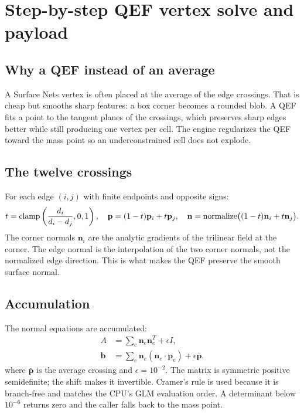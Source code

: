 \section{Step-by-step QEF vertex solve and payload}
\label{sec:qef}

\subsection{Why a QEF instead of an average}

A Surface Nets vertex is often placed at the average of the edge
crossings.  That is cheap but smooths sharp features: a box corner becomes
a rounded blob.  A QEF fits a point to the tangent planes of the crossings,
which preserves sharp edges better while still producing one vertex per
cell.  The engine regularizes the QEF toward the mass point so an
underconstrained cell does not explode.

\subsection{The twelve crossings}

For each edge $(i,j)$ with finite endpoints and opposite signs:
\begin{equation}
  t = \operatorname{clamp}\left(\frac{d_i}{d_i-d_j},0,1\right),
  \quad
  \mathbf{p} = (1-t)\mathbf{p}_i + t\mathbf{p}_j,
  \quad
  \mathbf{n} = \operatorname{normalize}\bigl((1-t)\mathbf{n}_i+t\mathbf{n}_j\bigr).
\end{equation}
The corner normals $\mathbf{n}_i$ are the analytic gradients of the
trilinear field at the corner.  The edge normal is the interpolation of
the two corner normals, not the normalized edge direction.  This is what
makes the QEF preserve the smooth surface normal.

\subsection{Accumulation}

The normal equations are accumulated:
\begin{align}
  A &= \sum_e \mathbf{n}_e\mathbf{n}_e^{T} + \epsilon I,\\
  \mathbf{b} &= \sum_e \mathbf{n}_e(\mathbf{n}_e\cdot\mathbf{p}_e)
             + \epsilon\bar{\mathbf{p}}.
\end{align}
where $\bar{\mathbf{p}}$ is the average crossing and $\epsilon=10^{-2}$.
The matrix is symmetric positive semidefinite; the shift makes it
invertible.  Cramer's rule is used because it is branch-free and matches
the CPU's GLM evaluation order.  A determinant below $10^{-6}$ returns zero
and the caller falls back to the mass point.

